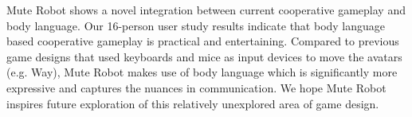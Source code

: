 \documentclass{chi-ext}
\begin{document}


Mute Robot shows a novel integration between current cooperative gameplay and body language. Our 16-person user study results indicate that body language based cooperative gameplay is practical and entertaining. 
Compared to previous game designs that used keyboards and mice as input devices to move the avatars (e.g. Way\cite{Way}), Mute Robot makes use of body language which is significantly more expressive and captures the nuances in communication. 
We hope Mute Robot inspires future exploration of this relatively unexplored area of game design.  

\end{document}
